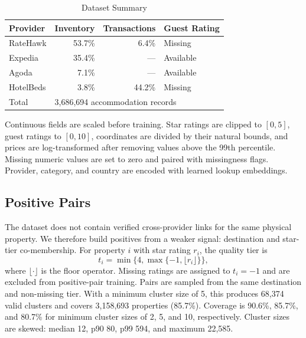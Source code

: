 \documentclass[conference,a4paper]{IEEEtran}
\begin{document}
\begin{table}[t]
\caption{Dataset Summary}
\label{tab:dataset}
\begin{center}
\begin{tabular}{lrrl}
\toprule
\textbf{Provider} & \textbf{Inventory} & \textbf{Transactions} & \textbf{Guest Rating} \\
\midrule
RateHawk  & 53.7\% & \phantom{0}6.4\% & Missing \\
Expedia   & 35.4\% & ---              & Available \\
Agoda     & \phantom{0}7.1\% & --- & Available \\
HotelBeds & \phantom{0}3.8\% & 44.2\% & Missing \\
\midrule
Total & \multicolumn{3}{l}{3,686,694 accommodation records} \\
\bottomrule
\end{tabular}
\end{center}
\end{table}

Continuous fields are scaled before training. Star ratings are clipped to $[0,5]$, guest ratings to $[0,10]$, coordinates are divided by their natural bounds, and prices are log-transformed after removing values above the 99th percentile. Missing numeric values are set to zero and paired with missingness flags. Provider, category, and country are encoded with learned lookup embeddings.

\subsection{Positive Pairs}

The dataset does not contain verified cross-provider links for the same physical property. We therefore build positives from a weaker signal: destination and star-tier co-membership. For property $i$ with star rating $r_i$, the quality tier is
\begin{equation}
t_i=\min\{4,\max\{-1,\lfloor r_i \rfloor\}\},
\label{eq:tier}
\end{equation}
where $\lfloor\cdot\rfloor$ is the floor operator. Missing ratings are assigned to $t_i=-1$ and are excluded from positive-pair training. Pairs are sampled from the same destination and non-missing tier. With a minimum cluster size of 5, this produces 68,374 valid clusters and covers 3,158,693 properties (85.7\%). Coverage is 90.6\%, 85.7\%, and 80.7\% for minimum cluster sizes of 2, 5, and 10, respectively. Cluster sizes are skewed: median 12, p90 80, p99 594, and maximum 22,585.
\end{document}
